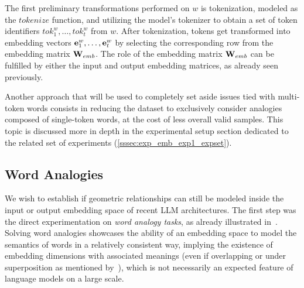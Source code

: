 The first preliminary transformations performed on $w$ is tokenization, modeled as the $\textit{tokenize}$ function, and utilizing the model's tokenizer to obtain a set of token identifiers $tok_1^w,\ldots,tok_t^w$ from $w$.
After tokenization, tokens get transformed into embedding vectors $\bm{\mathbf{e}}_1^w, \ldots, \bm{\mathbf{e}}_{t}^w$ by selecting the corresponding row from the embedding matrix $\bm{\mathbf{W}}_{emb}$.
The role of the embedding matrix $\bm{\mathbf{W}}_{emb}$ can be fulfilled by either the input and output embedding matrices, as already seen previously.

Another approach that will be used to completely set aside issues tied with multi-token words consists in reducing the dataset to exclusively consider analogies composed of single-token words, at the cost of less overall valid samples.
This topic is discussed more in depth in the experimental setup section dedicated to the related set of experiments (\cref{sssec:exp_emb_exp1_expset}).

\subsection{Word Analogies}\label{ssec:method_embeddings_analogies}

We wish to establish if geometric relationships can still be modeled inside the input or output embedding space of recent LLM architectures.
The first step  was the direct experimentation on \emph{word analogy tasks}, as already illustrated in~\citet{mikolov2013}.
Solving word analogies showcases the ability of an embedding space to model the semantics of words in a relatively consistent way, implying the existence of embedding dimensions with associated meanings (even if overlapping or under superposition as mentioned by~\citet{elhage2022,henighan2023}), which is not necessarily an expected feature of language models on a large scale.

